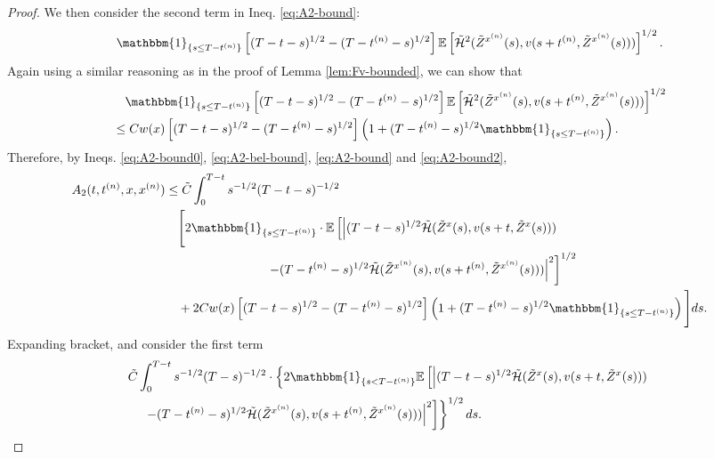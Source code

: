 \documentclass[11pt]{article}
\theoremstyle{definition}
\theoremstyle{plain}
\newcommand{\cH}{{\cal H}}
\newcommand{\mbOne}{\mathbbm{1}}
\begin{document}
\begin{appendices}
\begin{proof}
We then consider the second term in Ineq. \eqref{eq:A2-bound}: 
\[
\mbOne_{\{s \leq T - t^{(n)}\}} \left[ (T - t - s)^{1/2} - (T - t^{(n)} - s)^{1/2} \right] 
\mathbb{E} \left[ \tilde \cH^2(\tilde{Z}^{x^{(n)}}(s), v(s + t^{(n)}, \tilde{Z}^{x^{(n)}}(s))) \right]^{1/2}.
\]
Again using a similar reasoning as in the proof of Lemma \ref{lem:Fv-bounded}, we can show that 
\begin{align}
&\quad \mbOne_{\{s \leq T - t^{(n)}\}} \left[ (T - t - s)^{1/2} - (T - t^{(n)} - s)^{1/2} \right] 
\mathbb{E} \left[ \tilde \cH^2(\tilde{Z}^{x^{(n)}}(s), v(s + t^{(n)}, \tilde{Z}^{x^{(n)}}(s))) \right]^{1/2} \nonumber \\
& \leq Cw(x) \left[ (T - t - s)^{1/2} - (T - t^{(n)} - s)^{1/2} \right] \left(1 + (T-t^{(n)}-s)^{1/2} \mbOne_{\{s \leq T - t^{(n)}\}} \right).
\label{eq:A2-bound2}
\end{align}
Therefore, by Ineqs. \eqref{eq:A2-bound0}, \eqref{eq:A2-bel-bound}, \eqref{eq:A2-bound} and \eqref{eq:A2-bound2}, 
\begin{align*}
A_2(t, t^{(n)}, x, x^{(n)}) 
&\leq \tilde C \int_0^{T - t} s^{-1/2} (T - t-s)^{-1/2} \\
& \quad \Bigg[2 \mbOne_{\{s \leq T - t^{(n)}\}} \cdot \mathbb{E} \left[ \left| (T - t - s)^{1/2} 
\tilde \cH(\tilde{Z}^x(s), v(s + t, \tilde{Z}^x(s))) \right. \right. \\
&\left. \left. \qquad \qquad \qquad \qquad - (T - t^{(n)} - s)^{1/2} \tilde \cH(\tilde{Z}^{x^{(n)}}(s), v(s + t^{(n)}, \tilde{Z}^{x^{(n)}}(s))) \right|^2 \right]^{1/2} \\
& \quad + 2 Cw(x)  \left[ (T - t - s)^{1/2} - (T - t^{(n)} - s)^{1/2} \right] \left(1 + (T-t^{(n)}-s)^{1/2} \mbOne_{\{s \leq T - t^{(n)}\}} \right) \Bigg] ds.
\end{align*}
Expanding bracket, and consider the first term  
\begin{align*}
& \tilde C \int_0^{T - t} s^{-1/2} (T - s)^{-1/2} \cdot \left\{ 2 \mbOne_{\{s < T - t^{(n)}\}} 
\mathbb{E} \left[ \left| (T - t - s)^{1/2} \tilde \cH(\tilde{Z}^x(s), v(s + t, \tilde{Z}^x(s))) \right. \right. \right. \\
&\left. \left. \left. \quad - (T - t^{(n)} - s)^{1/2} \tilde \cH(\tilde{Z}^{x^{(n)}}(s), v(s + t^{(n)}, \tilde{Z}^{x^{(n)}}(s))) \right|^2 \right] \right\}^{1/2} ds.

\end{align*}
\end{proof}
\end{appendices}
\end{document}
